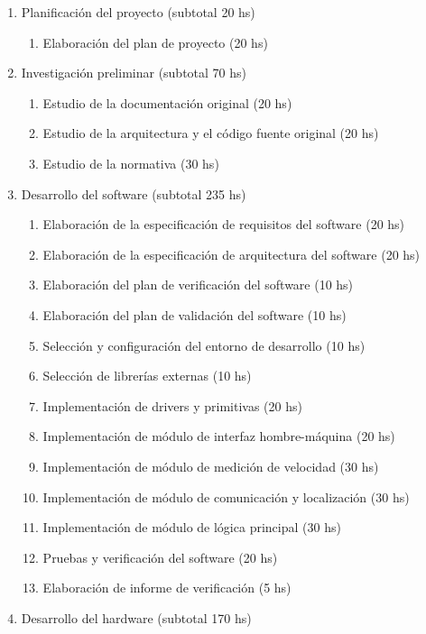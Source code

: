 \documentclass[11pt]{charter}
\begin{document}
\begin{enumerate}
\item Planificación del proyecto \hfill (subtotal 20 hs)
  \begin{enumerate}
  \item Elaboración del plan de proyecto \hfill (20 hs)
  \end{enumerate}
\item Investigación preliminar \hfill (subtotal 70 hs)
  \begin{enumerate}
  \item Estudio de la documentación original \hfill (20 hs)
  \item Estudio de la arquitectura y el código fuente original \hfill (20 hs)
  \item Estudio de la normativa \hfill (30 hs)
  \end{enumerate}
\item Desarrollo del software \hfill (subtotal 235 hs)
  \begin{enumerate}
  \item Elaboración de la especificación de requisitos del software \hfill (20 hs)
  \item Elaboración de la especificación de arquitectura del software \hfill (20 hs)
  \item Elaboración del plan de verificación del software \hfill (10 hs)
  \item Elaboración del plan de validación del software \hfill (10 hs)
  \item Selección y configuración del entorno de desarrollo \hfill (10 hs)
  \item Selección de librerías externas \hfill (10 hs)
  \item Implementación de drivers y primitivas \hfill (20 hs)
  \item Implementación de módulo de interfaz hombre-máquina \hfill (20 hs)
  \item Implementación de módulo de medición de velocidad \hfill (30 hs)
  \item Implementación de módulo de comunicación y localización \hfill (30 hs)
  \item Implementación de módulo de lógica principal \hfill (30 hs)
  \item Pruebas y verificación del software \hfill (20 hs)
  \item Elaboración de informe de verificación \hfill (5 hs)
  \end{enumerate}
\item Desarrollo del hardware \hfill (subtotal 170 hs)

\end{enumerate}
\end{document}
